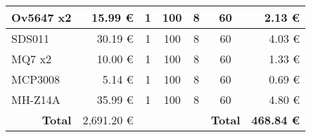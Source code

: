 \begin{table}[H]
{\begin{tabular}{l|r|cccc|r|}
			\multicolumn{1}{|l|}{Ov5647 x2}              & 15.99 €                                                 & \multicolumn{1}{c|}{1}                 & \multicolumn{1}{c|}{100}                                & \multicolumn{1}{c|}{8}                                  & 60                                  & 2.13 €                                                  \\ \hline
			\multicolumn{1}{|l|}{SDS011}                 & 30.19 €                                                 & \multicolumn{1}{c|}{1}                 & \multicolumn{1}{c|}{100}                                & \multicolumn{1}{c|}{8}                                  & 60                                  & 4.03 €                                                  \\ \hline
			\multicolumn{1}{|l|}{MQ7 x2}                 & 10.00 €                                                 & \multicolumn{1}{c|}{1}                 & \multicolumn{1}{c|}{100}                                & \multicolumn{1}{c|}{8}                                  & 60                                  & 1.33 €                                                  \\ \hline
			\multicolumn{1}{|l|}{MCP3008}                & 5.14 €                                                  & \multicolumn{1}{c|}{1}                 & \multicolumn{1}{c|}{100}                                & \multicolumn{1}{c|}{8}                                  & 60                                  & 0.69 €                                                  \\ \hline
			\multicolumn{1}{|l|}{MH-Z14A}                & 35.99 €                                                 & \multicolumn{1}{c|}{1}                 & \multicolumn{1}{c|}{100}                                & \multicolumn{1}{c|}{8}                                  & 60                                  & 4.80 €                                                  \\ \hline
			\multicolumn{1}{r|}{\textbf{Total}}          & 2,691.20 €                                              & \multicolumn{1}{l}{}                   & \multicolumn{1}{l}{}                                    & \multicolumn{1}{l}{}                                    & \multicolumn{1}{r|}{\textbf{Total}} & \textbf{468.84 €}                                       \\ \cline{2-2} \cline{7-7}
		\end{tabular}%
	}
\end{table}

